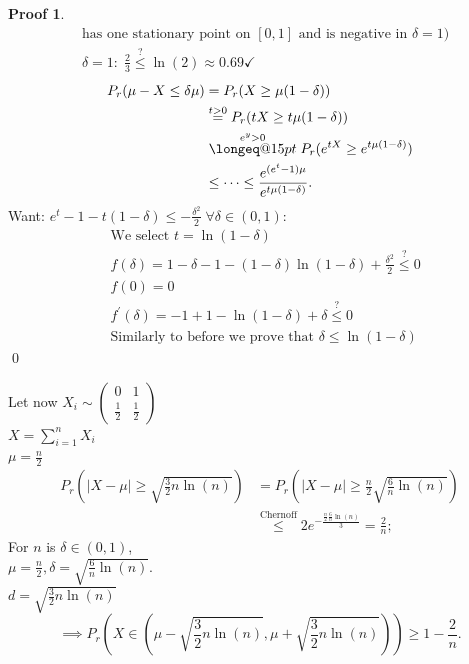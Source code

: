 \documentclass[a4paper, 12pt]{book}
\makeatletter
\theoremstyle{definition}
\newtheorem{pro}[counter]{Proof}
\theoremstyle{remark}
\newcommand{\longeq}[1]{\mathrel{\mathpalette\longeq@{#1}}}
\newcommand{\longeq@}[2]{%
  \begingroup
  \sbox\z@{$\m@th#1=$}%
  \ifdim#2<\wd\z@
    \resizebox{#2}{\height}{\box\z@}%
  \else
    \ifdim#2<3\wd\z@
      \hbox to #2{$\m@th#1=\hss=\hss=\hss=$}%
    \else
      \hbox to #2{$\m@th#1=\cleaders\hbox to 0.2\wd\z@{\hss$#1=$\hss}\hfil=$}%
    \fi
  \fi
  \endgroup
}
\makeatother
\begin{document}
\begin{pro}
\begin{align*}
    &\text{has one stationary point on }[0,1]\text{ and is negative in }\delta = 1)\\
    &\delta=1: \; \frac{2}{3} \stackrel{?}{\leq} \ln(2) \approx 0.69 \checkmark
  \end{align*}
  \begin{align*}
    P_r(\mu - X \leq \delta \mu) &= P_r(X \geq \mu(1-\delta)) \\
    &\stackrel{t>0}{=} P_r(tX \geq t\mu(1-\delta)) \\
    &\stackrel{e^y>0}{\longeq{15pt}} P_r(e^{tX} \geq e^{t\mu(1-\delta)}) \\
    &\leq \dots \leq \frac{e^{(e^t-1)\mu}}{e^{t\mu(1-\delta)}}.
  \end{align*}
  Want: $e^t - 1 - t(1-\delta) \leq -\frac{\delta^2}{2} \; \forall \delta \in (0,1)$:
  \begin{align*}
    &\text{We select }t = \ln(1-\delta) \\
    &f(\delta) = 1 - \delta - 1 - (1-\delta) \ln(1-\delta) + \frac{\delta^2}{2} \stackrel{?}{\leq} 0 \\
    &f(0) = 0 \\
    &f^{'}(\delta) = - 1 + 1 - \ln(1-\delta) + \delta \stackrel{?}{\leq} 0 \\
    &\text{Similarly to before we prove that }\delta \leq \ln(1-\delta)
  \end{align*}
  \qed
\end{pro}
Let now $X_i \sim \begin{pmatrix}0 & 1 \\ \frac{1}{2} & \frac{1}{2}\end{pmatrix}$ \\
$X = \sum_{i=1}^{n} X_i$ \\
$\mu = \frac{n}{2}$
\begin{align*}
  P_r\left(|X-\mu| \geq \sqrt{\frac{3}{2}n \ln(n)}\right)
  &= P_r\left(|X-\mu| \geq \frac{n}{2} \sqrt{\frac{6}{n} \ln(n)}\right) \\
  &\stackrel{\text{Chernoff}}{\leq} 2 e^{-\frac{\frac{n}{2} \frac{6}{n} \ln(n)}{3}} = \frac{2}{n};
\end{align*}
For  $n$ is $\delta \in (0,1)$, \\
$\mu = \frac{n}{2}, \delta = \sqrt{\frac{6}{n} \ln(n)}$. \\
$d = \sqrt{\frac{3}{2}n \ln(n)}$
\begin{equation*}
  \implies P_r\left(X \in \left(\mu - \sqrt{\frac{3}{2}n \ln(n)}, \mu + \sqrt{\frac{3}{2}n \ln(n)}\right)\right)
  \geq 1 - \frac{2}{n}.
\end{equation*}
\end{document}
